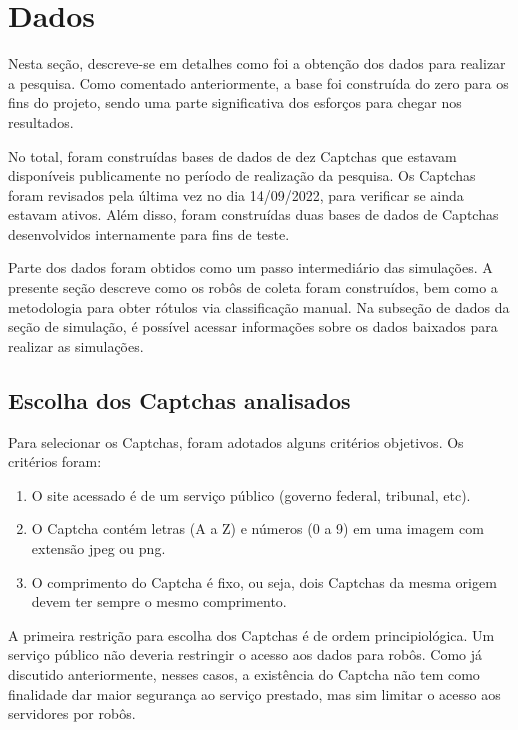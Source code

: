 \documentclass[12pt,twoside,brazilian]{book}
\providecommand{\tightlist}{%
  \setlength{\itemsep}{0pt}\setlength{\parskip}{0pt}}
\begin{document}
\hypertarget{dados}{%
\section{Dados}\label{dados}}

Nesta seção, descreve-se em detalhes como foi a obtenção dos dados para
realizar a pesquisa. Como comentado anteriormente, a base foi construída
do zero para os fins do projeto, sendo uma parte significativa dos
esforços para chegar nos resultados.

No total, foram construídas bases de dados de dez Captchas que estavam
disponíveis publicamente no período de realização da pesquisa. Os
Captchas foram revisados pela última vez no dia 14/09/2022, para
verificar se ainda estavam ativos. Além disso, foram construídas duas
bases de dados de Captchas desenvolvidos internamente para fins de
teste.

Parte dos dados foram obtidos como um passo intermediário das
simulações. A presente seção descreve como os robôs de coleta foram
construídos, bem como a metodologia para obter rótulos via classificação
manual. Na subseção de dados da seção de simulação, é possível acessar
informações sobre os dados baixados para realizar as simulações.

\hypertarget{escolha-dos-captchas-analisados}{%
\subsection{Escolha dos Captchas
analisados}\label{escolha-dos-captchas-analisados}}

Para selecionar os Captchas, foram adotados alguns critérios objetivos.
Os critérios foram:

\begin{enumerate}
\def\labelenumi{\arabic{enumi}.}
\tightlist
\item
  O site acessado é de um serviço público (governo federal, tribunal,
  etc).
\item
  O Captcha contém letras (A a Z) e números (0 a 9) em uma imagem com
  extensão jpeg ou png.
\item
  O comprimento do Captcha é fixo, ou seja, dois Captchas da mesma
  origem devem ter sempre o mesmo comprimento.
\end{enumerate}

A primeira restrição para escolha dos Captchas é de ordem
principiológica. Um serviço público não deveria restringir o acesso aos
dados para robôs. Como já discutido anteriormente, nesses casos, a
existência do Captcha não tem como finalidade dar maior segurança ao
serviço prestado, mas sim limitar o acesso aos servidores por robôs.
\end{document}
